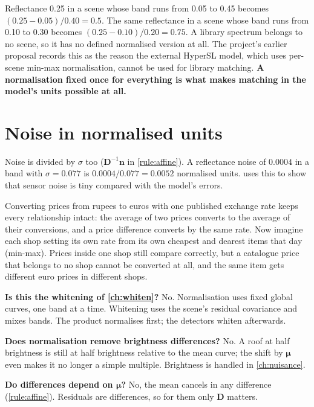 \documentclass[11pt,a4paper,oneside,openany]{book}
\newcommand{\B}[1]{{\symbf{#1}}}
\newcommand{\B}[1]{{\bm{#1}}}
\newcommand{\vn}{\B{n}}
\newcommand{\vmu}{\B{\mu}}
\newcommand{\mD}{\B{D}}
\begin{document}
Reflectance 0.25 in a scene whose band runs from 0.05 to 0.45 becomes $(0.25-0.05)/0.40=0.5$. The same reflectance in a scene whose band
runs from 0.10 to 0.30 becomes $(0.25-0.10)/0.20=0.75$. A library spectrum belongs to no scene, so it has no defined normalised
version at all. The project's earlier proposal records this as the reason the external HyperSL model, which uses per-scene min-max
normalisation, cannot be used for library matching. \textbf{A normalisation fixed once for everything is what makes matching in the
model's units possible at all.}

\section{Noise in normalised units}

Noise is divided by $\sigma$ too ($\mD^{-1}\vn$ in \cref{rule:affine}). A reflectance noise of $0.0004$ in a band with $\sigma=0.077$ is
$0.0004/0.077=0.0052$ normalised units.  uses this to show that sensor noise is tiny compared with the model's errors.

\begin{analogy}
Converting prices from rupees to euros with one published exchange rate keeps every relationship intact: the average of two prices
converts to the average of their conversions, and a price difference converts by the same rate. Now imagine each shop setting its own
rate from its own cheapest and dearest items that day (min-max). Prices inside one shop still compare correctly, but a catalogue price
that belongs to no shop cannot be converted at all, and the same item gets different euro prices in different shops.
\end{analogy}

\begin{confusions}
\textbf{Is this the whitening of \cref{ch:whiten}?} No. Normalisation uses fixed global curves, one band at a time. Whitening uses the
scene's residual covariance and mixes bands. The product normalises first; the detectors whiten afterwards.

\textbf{Does normalisation remove brightness differences?} No. A roof at half brightness is still at half brightness relative to the
mean curve; the shift by $\vmu$ even makes it no longer a simple multiple. Brightness is handled in \cref{ch:nuisance}.

\textbf{Do differences depend on $\vmu$?} No, the mean cancels in any difference (\cref{rule:affine}). Residuals are differences, so
for them only $\mD$ matters.
\end{confusions}
\end{document}
